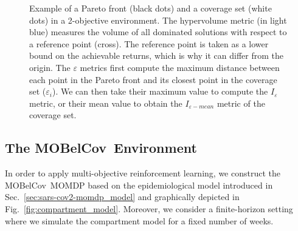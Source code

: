 \documentclass{article}
\newcommand{\momdpname}{MOBelCov}
\begin{document}
\begin{figure}[t!]
    \centering
    \caption{Example of a Pareto front (black dots) and a coverage set (white dots) in a 2-objective environment. The hypervolume metric (in light blue) measures the volume of all dominated solutions with respect to a reference point (cross). The reference point is taken as a lower bound on the achievable returns, which is why it can differ from the origin. The $\varepsilon$ metrics first compute the maximum distance between each point in the Pareto front and its closest point in the coverage set ($\varepsilon_i$). We can then take their maximum value to compute the $I_\varepsilon$ metric, or their mean value to obtain the $I_{\varepsilon-mean}$ metric of the coverage set.}
    \label{fig:paretofrontmetrics}
\end{figure}

\subsection{The \momdpname\ Environment}
\label{sec:covid-momdp}
In order to apply multi-objective reinforcement learning, we construct the \momdpname\ MOMDP based on the epidemiological model introduced in Sec.~\ref{sec:sars-cov2-momdp_model} and graphically depicted in Fig.~\ref{fig:compartment_model}. Moreover, we consider a finite-horizon setting where we simulate the compartment model for a fixed number of weeks.
\end{document}
